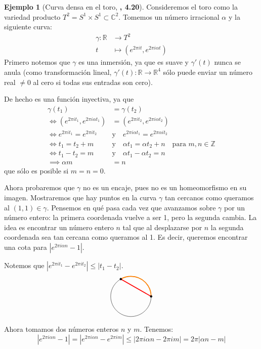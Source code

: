 \documentclass[spanish]{book}
\theoremstyle{definition}
\newtheorem*{ejem}{Ejemplo}
\newcommand{\R}{\mathbb{R}}
\newcommand{\Z}{\mathbb{Z}}
\newcommand{\C}{\mathbb{C}}
\begin{document}
\begin{ejem}[Curva densa en el toro, \cite{Lee} \textbf{, 4.20}]
	Consideremos el toro como la variedad producto $T^2=S^1\times S^1\subset\C^2$. Tomemos un número irracional $\alpha$ y la siguiente curva:
	\begin{align*}
		\gamma:\R&\to T^2\\
		t&\mapsto(e^{2\pi it},e^{2\pi i\alpha t})
	\end{align*}
	Primero notemos que $\gamma$ es una inmersión, ya que es suave y $\gamma'(t)$ nunca se anula (como transformación lineal, $\gamma'(t):\R\to\R^4$ sólo puede enviar un número real $\neq0$ al cero si todas sus entradas son cero).
	
	De hecho es una función inyectiva, ya que
	\begin{align*}
		\gamma(t_1)&=\gamma(t_2)\\
		\iff (e^{2 \pi it_1},e^{2\pi i\alpha t_1})&=(e^{2\pi it_2},e^{2\pi i\alpha t_2})\\
		\iff e^{2\pi it_1}=e^{2\pi it_2}\quad&\text{y}\quad e^{2\pi i\alpha t_1}=e^{2\pi\alpha it_2}\\
		\iff t_1=t_2+m\quad&\text{y}\quad\alpha t_1=\alpha t_2+n\quad\text{para }m,n\in\Z\\
		\iff t_1-t_2=m\quad&\text{y}\quad \alpha t_1-\alpha t_2=n\\
		\implies\alpha m&=n
	\end{align*}
	que sólo es posible si $m=n=0$.
	
	Ahora probaremos que $\gamma$ no es un encaje, pues no es un homeomorfismo en su imagen. Mostraremos que hay puntos en la curva $\gamma$ tan cercanos como queramos al $(1,1)\in \gamma$. Pensemos en qué pasa cada vez que avanzamos sobre $\gamma$ por un número entero: la primera coordenada vuelve a ser 1, pero la segunda cambia. La idea es encontrar un número entero $n$ tal que al desplazarse por $n$ la segunda coordenada sea tan cercana como queramos al 1. Es decir, queremos encontrar una cota para $|e^{2\pi i\alpha n}-1|$.
	
	Notemos que $|e^{2\pi it_1}-e^{2\pi it_2}|\leq|t_1-t_2|$.
	\[\begin{tikzpicture}
		\draw (0,0) circle (1);
		\draw[very thick,orange] (1,0) arc (0:120:1);
		\draw[very thick, red] (1,0)--(-.5,.866);
		\draw[fill=black] (-.5,.866) circle (0.05);
		\draw[fill=black] (1,0) circle (0.05);
	\end{tikzpicture}\]
	Ahora tomamos dos números enteros $n$ y $m$. Tenemos:
	\[|e^{2\pi i\alpha n}-1|=|e^{2\pi i\alpha n}-e^{2\pi im}|\leq|2\pi i\alpha n-2\pi im|=2\pi|\alpha n-m|\]
	

\end{ejem}
\end{document}
